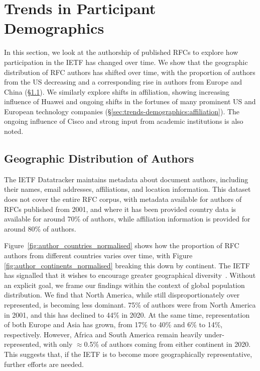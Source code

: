 \documentclass[twocolumn,10pt]{article}
\begin{document}
\section{Trends in Participant Demographics}
\label{sec:trends-demographics}

In this section, we look at the authorship of published RFCs to explore
how participation in the IETF has changed over time. We show that the
geographic distribution of RFC authors has shifted over time, with the
proportion of authors from the US decreasing and a corresponding rise in
authors from Europe and China (\S\ref{sec:trends-demographics:geographic}).
We similarly explore shifts in affiliation, showing increasing influence of
Huawei and ongoing shifts in the fortunes of many prominent US and European
technology companies (\S\ref{sec:trends-demographics:affiliation}). The
ongoing influence of Cisco and strong input from academic institutions is
also noted.


\subsection{Geographic Distribution of Authors}
\label{sec:trends-demographics:geographic}

The IETF Datatracker maintains metadata about document authors, including
their names, email addresses, affiliations, and location information. This
dataset does not cover the entire RFC corpus, with metadata available for
authors of RFCs published from 2001, and where it has been provided country
data is available for around 70\% of authors, while affiliation information
is provided for around 80\% of authors. 

Figure~\ref{fig:author_countries_normalised} shows how the proportion of
RFC authors from different countries varies over time, with Figure
\ref{fig:author_continents_normalised} breaking this down by continent.
The IETF has signalled that it wishes to encourage greater geographical
diversity~\cite{RFC7704,ietfblog:diversity}.  Without an explicit goal, we
frame our findings within the context of global population distribution.
We find that North America, while still disproportionately over represented,
is becoming less dominant.  75\% of authors were from North America in 2001,
and this has declined to 44\% in 2020. At the same time, representation of
both Europe and Asia has grown, from 17\% to 40\% and 6\% to 14\%, respectively.
However, Africa and South America remain heavily under-represented, with
only $\approx$0.5\% of authors coming from either continent in 2020.  This
suggests that, if the IETF is to become more geographically representative,
further efforts are needed.
\end{document}
